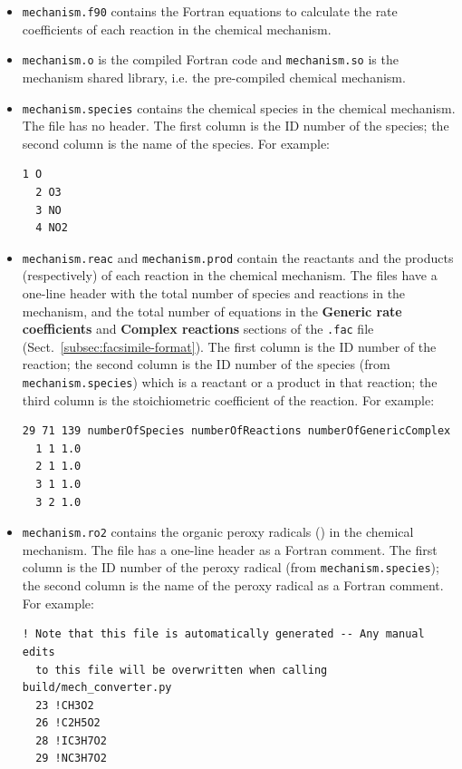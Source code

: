 \begin{itemize}
\item \texttt{mechanism.f90} contains the Fortran equations to calculate the rate coefficients
  of each reaction in the chemical mechanism.
\item \texttt{mechanism.o} is the compiled Fortran code and \texttt{mechanism.so} is the
  mechanism shared library, i.e. the pre-compiled chemical mechanism.
\item \texttt{mechanism.species} contains the chemical species in the chemical mechanism. The
  file has no header. The first column is the ID number of the species; the second column is
  the name of the species. For example:
  \begin{Verbatim}[fontsize=\small]
  1 O
  2 O3
  3 NO
  4 NO2
  \end{Verbatim}
\item \texttt{mechanism.reac} and \texttt{mechanism.prod} contain the reactants and the
  products (respectively) of each reaction in the chemical mechanism. The files have a one-line
  header with the total number of species and reactions in the mechanism, and the total number
  of equations in the \textbf{Generic rate coefficients} and \textbf{Complex reactions}
  sections of the \texttt{.fac} file (Sect.~\ref{subsec:facsimile-format}). The first column is
  the ID number of the reaction; the second column is the ID number of the species (from
  \texttt{mechanism.species}) which is a reactant or a product in that reaction; the third
  column is the stoichiometric coefficient of the reaction. For example:
  \begin{Verbatim}[fontsize=\small]
  29 71 139 numberOfSpecies numberOfReactions numberOfGenericComplex
  1 1 1.0
  2 1 1.0
  3 1 1.0
  3 2 1.0
  \end{Verbatim}
\item \texttt{mechanism.ro2} contains the organic peroxy radicals () in the chemical
  mechanism. The file has a one-line header as a Fortran comment. The first column is the ID
  number of the peroxy radical (from \texttt{mechanism.species}); the second column is the name
  of the peroxy radical as a Fortran comment. For example:
  \begin{Verbatim}[fontsize=\small]
  ! Note that this file is automatically generated -- Any manual edits
  to this file will be overwritten when calling build/mech_converter.py
  23 !CH3O2
  26 !C2H5O2
  28 !IC3H7O2
  29 !NC3H7O2
  \end{Verbatim}
\end{itemize}

